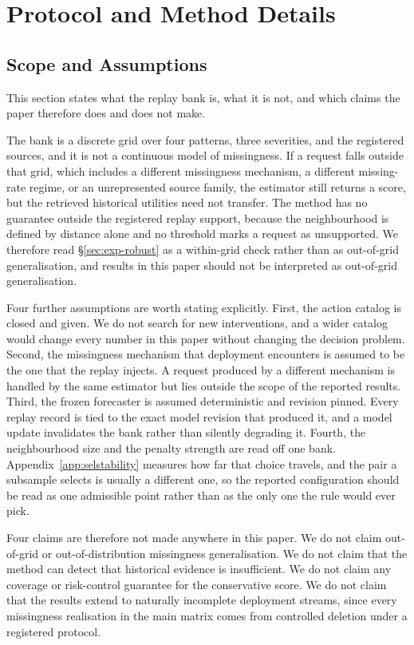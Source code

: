 \documentclass{article}
\begin{document}
\section{Protocol and Method Details}
\label{app:protocol}
\subsection{Scope and Assumptions}
\label{app:scope}
This section states what the replay bank is, what it is not, and which claims the paper
therefore does and does not make.

The bank is a discrete grid over four patterns, three severities, and the registered sources,
and it is not a continuous model of missingness. If a request falls outside that grid, which
includes a different missingness mechanism, a different missing-rate regime, or an
unrepresented source family, the estimator still returns a score, but the retrieved
historical utilities need not transfer. The method has no guarantee outside the registered
replay support, because the neighbourhood is defined by distance alone and no threshold marks
a request as unsupported. We therefore read \S\ref{sec:exp-robust} as a within-grid check
rather than as out-of-grid generalisation, and results in this paper should not be interpreted
as out-of-grid generalisation.

Four further assumptions are worth stating explicitly. First, the action catalog is closed and
given. We do not search for new interventions, and a wider catalog would change every number
in this paper without changing the decision problem. Second, the missingness mechanism that
deployment encounters is assumed to be the one that the replay injects. A request produced by
a different mechanism is handled by the same estimator but lies outside the scope of the
reported results. Third, the frozen forecaster is assumed deterministic and revision pinned.
Every replay record is tied to the exact model revision that produced it, and a model update
invalidates the bank rather than silently degrading it. Fourth, the neighbourhood size and the
penalty strength are read off one bank. Appendix~\ref{app:selstability} measures how far that
choice travels, and the pair a subsample selects is usually a different one, so the reported
configuration should be read as one admissible point rather than as the only one the rule
would ever pick.

Four claims are therefore not made anywhere in this paper. We do not claim out-of-grid or
out-of-distribution missingness generalisation. We do not claim that the method can detect
that historical evidence is insufficient. We do not claim any coverage or risk-control
guarantee for the conservative score. We do not claim that the results extend to naturally
incomplete deployment streams, since every missingness realisation in the main matrix comes
from controlled deletion under a registered protocol.
\end{document}
